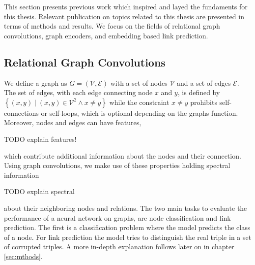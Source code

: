 This section presents previous work which inspired and layed the fundaments for this thesis. Relevant publication on topics related to this thesis are presented in terms of methods and results. We focus on the fields of relational graph convolutions, graph encoders, and embedding based link prediction.

\subsection{Relational Graph Convolutions}
We define a graph as $G=(\mathcal{V}, \mathcal{E})$  with a set of nodes $\mathcal{V}$ and a set of edges $\mathcal{E}$. The set of edges, with each edge connecting node $x$ and $y$, is defined by $\left\{(x, y) \mid(x, y) \in \mathcal{V}^{2} \wedge x \neq y\right\}$ while the constraint $x \neq y$ prohibits self-connections or self-loops, which is optional depending on the graphs function. Moreover, nodes and edges can have features, 

TODO explain features!

which contribute additional information about the nodes and their connection. Using graph convolutions, we make use of these properties holding spectral information

TODO explain spectral

about their neighboring nodes and relations. The two main tasks to evaluate the performance of a neural network on graphs, are node classification and link prediction. The first is a classification problem where the model predicts the class of a node. For link prediction the model tries to distinguish the real triple in a set of corrupted triples. A more in-depth explanation follows later on in chapter \ref{sec:mthods}.

